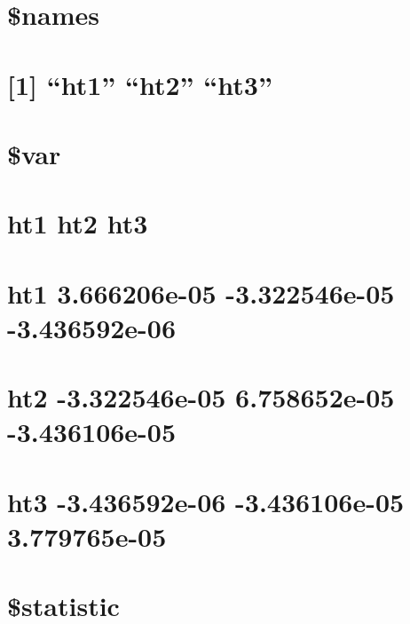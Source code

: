 \documentclass[]{book}
\theoremstyle{definition}
\theoremstyle{definition}
\theoremstyle{definition}
\theoremstyle{remark}
\begin{document}
\section{\$names}\label{names}

\section{\texorpdfstring{{[}1{]} ``ht1'' ``ht2''
``ht3''}{{[}1{]} ht1 ht2 ht3}}\label{ht1-ht2-ht3-1}

\section{}\label{section-55}

\section{\$var}\label{var}

\section{ht1 ht2 ht3}\label{ht1-ht2-ht3-2}

\section{ht1 3.666206e-05 -3.322546e-05
-3.436592e-06}\label{ht1-3.666206e-05--3.322546e-05--3.436592e-06}

\section{ht2 -3.322546e-05 6.758652e-05
-3.436106e-05}\label{ht2--3.322546e-05-6.758652e-05--3.436106e-05}

\section{ht3 -3.436592e-06 -3.436106e-05
3.779765e-05}\label{ht3--3.436592e-06--3.436106e-05-3.779765e-05}

\section{}\label{section-56}

\section{\$statistic}\label{statistic}
\end{document}
